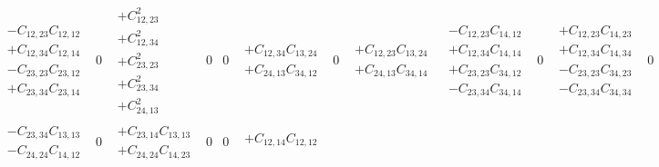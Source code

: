 \documentclass[pra,nofootinbib]{revtex4-1}
\newcommand{\C}[2]{C_{{#1},{#2}}}
\begin{document}
\begin{eqnarray}
\begin{array}{cccccccccccccccc}
     \begin{array}{c}
     - \C{12}{23}\C{12}{12} \\
     + \C{12}{34}\C{12}{14} \\
     - \C{23}{23}\C{23}{12} \\
     + \C{23}{34}\C{23}{14}
     \end{array} &
     0 &
     \begin{array}{c}
     + \C{12}{23}^2 \\
     + \C{12}{34}^2 \\
     + \C{23}{23}^2 \\
     + \C{23}{34}^2 \\
     + \C{24}{13}^2
     \end{array} &
     0 &
     0 &
     \begin{array}{c}
     + \C{12}{34}\C{13}{24} \\
     + \C{24}{13}\C{34}{12}
     \end{array} &
     0 &
     \begin{array}{c}
     + \C{12}{23}\C{13}{24} \\
     + \C{24}{13}\C{34}{14}
     \end{array} &
     \begin{array}{c}
     - \C{12}{23}\C{14}{12} \\
     + \C{12}{34}\C{14}{14} \\
     + \C{23}{23}\C{34}{12} \\
     - \C{23}{34}\C{34}{14}
     \end{array} &
     0 &
     \begin{array}{c}
     + \C{12}{23}\C{14}{23} \\
     + \C{12}{34}\C{14}{34} \\
     - \C{23}{23}\C{34}{23} \\
     - \C{23}{34}\C{34}{34}
     \end{array} &
     0 \\
     \begin{array}{c}
     - \C{23}{34}\C{13}{13} \\
     - \C{24}{24}\C{14}{12}
     \end{array} &
     0 &
     \begin{array}{c}
     + \C{23}{14}\C{13}{13} \\
     + \C{24}{24}\C{14}{23}
     \end{array} &
     0 &
     0 &
     \begin{array}{c}
     + \C{12}{14}\C{12}{12} \\

\end{array}
\end{array}
\end{eqnarray}
\end{document}
